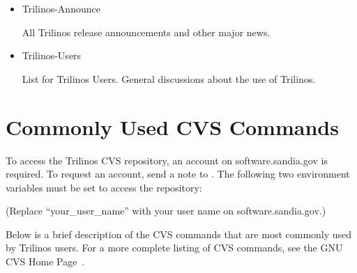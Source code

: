 \documentclass[12pt,relax]{TrilinosUserGuide}
\begin{document}
\begin{itemize}
\item Trilinos-Announce 

All Trilinos release announcements and other major news.

\item Trilinos-Users 

List for Trilinos Users.  General discussions about the use of Trilinos.
\end{itemize}


\clearpage

%


\appendix
\section{Commonly Used CVS Commands}
\label{Section:CVS}
To access the Trilinos CVS repository, an account on software.sandia.gov is 
required.  To request an account, send a note to 
.  
The following two 
environment variables must be set to access the repository:


(Replace ``your\_user\_name'' with your user name on software.sandia.gov.)

Below is a brief description of the CVS commands that are most commonly 
used by Trilinos users.  For a 
more complete listing of CVS commands, see the GNU CVS Home Page~\cite{CVS}.
\end{document}
